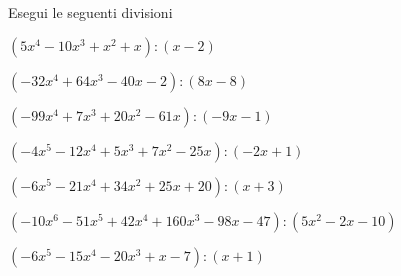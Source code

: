 \begin{esercizio}\label{ese:}
Esegui le seguenti divisioni
\begin{enumeratea}
\item  \(\left(5 x^4 -10 x^3 + x^2 + x  \right) : 
\left(x -2 \right)\)
\item  \(\left(-32 x^4 +64 x^3 -40 x -2 \right) : 
\left(8 x -8 \right)\)
\item  \(\left(-99 x^4 +7 x^3 +20 x^2 -61 x  \right) : 
\left(-9 x -1 \right)\)
\item  \(\left(-4 x^5 -12 x^4 +5 x^3 +7 x^2 -25 x  \right) : 
\left(-2 x +1 \right)\)\\
\item  \(\left(-6 x^5 -21 x^4 +34 x^2 +25 x +20 \right) : 
\left(x +3 \right)\)\\
\item  \(\left(-10 x^6 -51 x^5 +42 x^4 +160 x^3 -98 x -47 \right) : 
\left(5 x^2 -2 x -10 \right)\)\\
\item  \(\left(-6 x^5 -15 x^4 -20 x^3 + x -7 \right) : 
\left(x +1 \right)\)\\
\end{enumeratea}
\end{esercizio}

